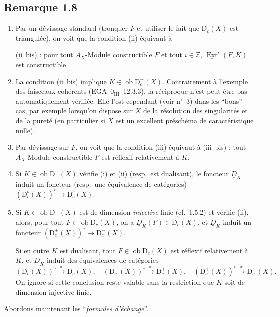 \documentclass[11pt]{article}
\DeclareMathOperator{\Ext}{Ext}
\newcommand{\D}{\mathrm{D}}
\newcommand{\Z}{\mathbb{Z}}
\newcommand{\ob}{\operatorname{ob}}
\providecommand{\ob}{\operatorname{ob}}
\providecommand{\Z}{\mathbb Z}
\begin{document}
\subsection*{Remarque 1.8}
\begin{enumerate}[label=\alph*)]
\item Par un dévissage standard (tronquer $F$ et utiliser le fait que $\D_c(X)$ est triangulée), on voit que la condition (ii) équivaut à

(ii~bis) : pour tout $A_X$-Module constructible $F$ et tout $i \in \Z$, $\underline{\Ext}^i(F,K)$ est constructible.

\item La condition (ii~bis) implique $K \in \ob \D_c^{+}(X)$. Contrairement à l'exemple des faisceaux cohérents (EGA~$0_{\mathrm{III}}$~12.3.3), la réciproque n'est peut-être pas automatiquement vérifiée. Elle l'est cependant (voir n${}^{\circ}$~3) dans les ``bons'' cas, par exemple lorsqu'on dispose sur $X$ de la résolution des singularités et de la pureté (en particulier si $X$ est un excellent préschéma de caractéristique nulle).

\item Par dévissage sur $F$, on voit que la condition (iii) équivaut à (iii~bis) : tout $A_X$-Module constructible $F$ est réflexif relativement à $K$.

\item Si $K \in \ob \D^{+}(X)$ vérifie (i) et (ii) (resp.~est dualisant), le foncteur $\underline{D}_K$ induit un foncteur (resp.~une équivalence de catégories) $(\D_c^{b}(X))^{\circ} \to \D_c^{b}(X)$.

\item Si $K \in \ob \D^{+}(X)$ est de dimension \emph{injective} finie (cf.~1.5.2) et vérifie (ii), alors, pour tout $F \in \ob \D_c(X)$, on a $\underline{D}_K(F) \in \D_c(X)$, et $\underline{D}_K$ induit un foncteur $(\D_c^{+}(X))^{\circ} \to \D_c^{-}(X)$.

Si en outre $K$ est dualisant, tout $F \in \ob \D_c(X)$ est réflexif relativement à $K$, et $\underline{D}_K$ induit des équivalences de catégories
\[
(\D_c(X))^{\circ} \xrightarrow{\approx} \D_c(X), \quad (\D_c^{-}(X))^{\circ} \xrightarrow{\approx} \D_c^{+}(X), \quad (\D_c^{+}(X))^{\circ} \xrightarrow{\approx} \D_c^{-}(X).
\]
On ignore si cette conclusion reste valable sans la restriction que $K$ soit de dimension injective finie.
\end{enumerate}

Abordons maintenant les ``\emph{formules d'échange}''.
\end{document}
